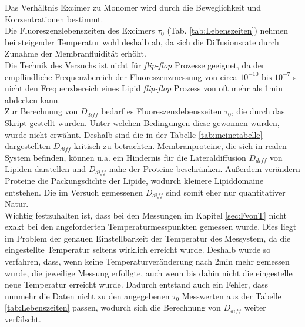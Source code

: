 Das Verhältnis Excimer zu Monomer wird durch die Beweglichkeit und  Konzentrationen bestimmt. \cite{Creuwels1996}\\
Die Fluoreszenzlebenszeiten des Excimers $\tau_0$ (Tab. \ref{tab:Lebenszeiten}) nehmen bei steigender Temperatur wohl deshalb ab, da sich die Diffusionsrate durch Zunahme der Membranfluidität erhöht.\\
Die Technik des Versuchs ist nicht für \textit{flip-flop}  Prozesse geeignet, da der empflindliche Frequenzbereich der Fluoreszenzmessung von circa $10^{-10}\text{ bis } 10^{-7}$ s nicht den Frequenzbereich eines Lipid \textit{flip-flop} Prozess von oft mehr als 1min abdecken kann. \\
Zur Berechnung von $D_{diff}$ bedarf  es Fluoreszenzlebenszeiten $\tau_0$, die durch das Skript gestellt wurden. Unter welchen Bedingungen diese gewonnen wurden, wurde nicht erwähnt. Deshalb sind die in der Tabelle \ref{tab:meinetabelle} dargestellten $D_{diff}$ kritisch zu betrachten. Membranproteine, die sich in realen System befinden, können u.a. ein Hindernis für die Lateraldiffusion $D_{diff}$ von Lipiden darstellen und $D_{diff}$ nahe der Proteine beschränken. Außerdem verändern Proteine die Packungsdichte der Lipide, wodurch kleinere Lipiddomaine entstehen. Die im Versuch gemessenen $D_{diff}$ sind somit eher nur quantitativer Natur. \\
Wichtig festzuhalten ist, dass bei den Messungen im Kapitel \ref{sec:FvonT} nicht exakt bei den angeforderten Temperaturmesspunkten gemessen wurde. Dies liegt im Problem der genauen Einstellbarkeit der Temperatur des Messystem, da die eingestellte Temperatur seltens wirklich erreicht wurde. Deshalb wurde so verfahren, dass, wenn keine Temperaturveränderung nach 2min mehr gemessen wurde, die jeweilige Messung erfollgte, auch wenn bis dahin nicht die eingestelle neue Temperatur erreicht wurde. Dadurch entstand auch ein Fehler, dass nunmehr die Daten nicht zu den angegebenen $\tau_0$ Messwerten aus der Tabelle \ref{tab:Lebenszeiten} passen, wodurch sich die Berechnung von  $D_{diff}$ weiter verfälscht.

\newpage